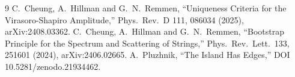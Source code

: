 \documentclass[11pt]{article}
\begin{document}
\begin{thebibliography}{9}
 C.~Cheung, A.~Hillman and G.~N.~Remmen,
``Uniqueness Criteria for the Virasoro-Shapiro Amplitude,''
Phys.\ Rev.\ D 111, 086034 (2025), arXiv:2408.03362.
 C.~Cheung, A.~Hillman and G.~N.~Remmen,
``Bootstrap Principle for the Spectrum and Scattering of Strings,''
Phys.\ Rev.\ Lett.\ 133, 251601 (2024), arXiv:2406.02665.
 A.~Pluzhnik, ``The Island Has Edges,'' DOI 10.5281/zenodo.21934462.
\end{thebibliography}
\end{document}
